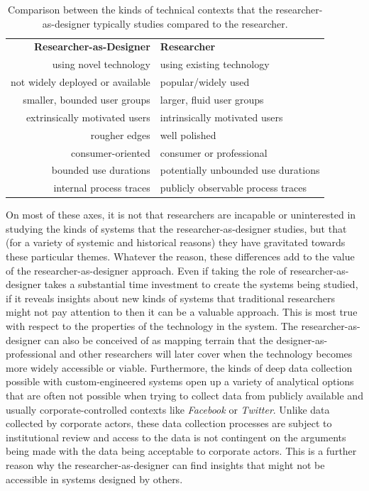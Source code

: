 \begin{table}[tb]
\begin{tabular}{r|l}
\textbf{Researcher-as-Designer} & \textbf{Researcher} \\
using novel technology & using existing technology \\
not widely deployed or available & popular/widely used \\
smaller, bounded user groups & larger, fluid user groups \\
extrinsically motivated users & intrinsically motivated users\\
rougher edges & well polished\\
consumer-oriented & consumer or professional\\
bounded use durations & potentially unbounded use durations\\
internal process traces & publicly observable process traces\\
\end{tabular}
\label{table:research-focus-comparison}
\caption{Comparison between the kinds of technical contexts that the researcher-as-designer typically studies compared to the researcher.}
\end{table}

On most of these axes, it is not that researchers are incapable or uninterested in studying the kinds of systems that the researcher-as-designer studies, but that (for a variety of systemic and historical reasons) they have gravitated towards these particular themes. Whatever the reason, these differences add to the value of the researcher-as-designer approach. Even if taking the role of researcher-as-designer takes a substantial time investment to create the systems being studied, if it reveals insights about new kinds of systems that traditional researchers might not pay attention to then it can be a valuable approach. This is most true with respect to the properties of the technology in the system. The researcher-as-designer can also be conceived of as mapping terrain that the designer-as-professional and other researchers will later cover when the technology becomes more widely accessible or viable. Furthermore, the kinds of deep data collection possible with custom-engineered systems open up a variety of analytical options that are often not possible when trying to collect data from publicly available and usually corporate-controlled contexts like \emph{Facebook} or \emph{Twitter}. Unlike data collected by corporate actors, these data collection processes are subject to institutional review and access to the data is not contingent on the arguments being made with the data being acceptable to corporate actors. This is a further reason why the researcher-as-designer can find insights that might not be accessible in systems designed by others.

